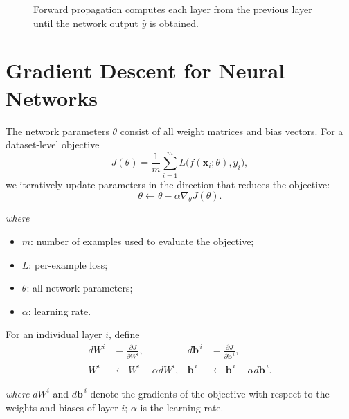 \documentclass[11pt,a4paper]{report}
\newcommand{\vect}[1]{\bm{#1}}
\newcommand{\wherelegend}{\par\smallskip\textit{where}\vspace{-0.3em}}
\begin{document}
\begin{figure}[H]
\centering
{}
\caption{Forward propagation computes each layer from the previous layer until the network output $\hat y$ is obtained.}
\label{fig:forward-network}
\end{figure}

\section{Gradient Descent for Neural Networks}

The network parameters $\theta$ consist of all weight matrices and bias vectors. For a dataset-level objective
\begin{equation}
  J(\theta)=\frac{1}{m}\sum_{i=1}^{m}L\bigl(f(\vect{x}_i;\theta),y_i\bigr),
  \label{eq:dnn-cost}
\end{equation}
we iteratively update parameters in the direction that reduces the objective:
\begin{equation}
  \theta \leftarrow \theta-\alpha\nabla_{\theta}J(\theta).
  \label{eq:dnn-gd}
\end{equation}
\wherelegend
\begin{itemize}
  \item $m$: number of examples used to evaluate the objective;
  \item $L$: per-example loss;
  \item $\theta$: all network parameters;
  \item $\alpha$: learning rate.
\end{itemize}

For an individual layer $i$, define
\begin{align}
  dW^i &= \frac{\partial J}{\partial W^i}, & d\vect{b}^{\,i} &= \frac{\partial J}{\partial \vect{b}^{\,i}},\\
  W^i &\leftarrow W^i-\alpha dW^i, & \vect{b}^{\,i} &\leftarrow \vect{b}^{\,i}-\alpha d\vect{b}^{\,i}.
  \label{eq:layer-updates}
\end{align}
\wherelegend
$dW^i$ and $d\vect{b}^{\,i}$ denote the gradients of the objective with respect to the weights and biases of layer $i$; $\alpha$ is the learning rate.
\end{document}
